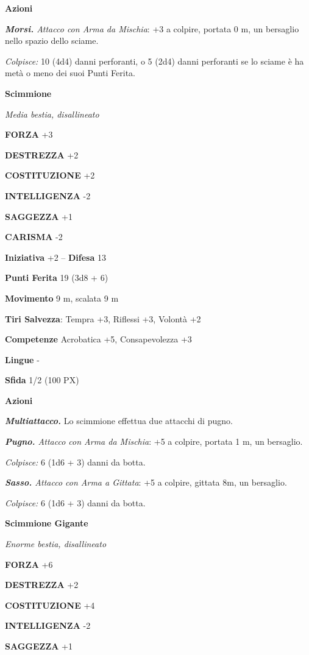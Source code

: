 \begin{multicols}{2}
	\textbf{Azioni}

	\textit{\textbf{Morsi.} Attacco con Arma da Mischia}: +3 a colpire, portata 0 m, un bersaglio nello spazio dello sciame.

	\textit{Colpisce:} 10 (4d4) danni perforanti, o 5 (2d4) danni perforanti se lo sciame è ha metà o meno dei suoi Punti Ferita.

	\medskip\textbf{Scimmione}

	\textit{Media bestia, disallineato}

	\textbf{FORZA} +3

	\textbf{DESTREZZA} +2

	\textbf{COSTITUZIONE} +2

	\textbf{INTELLIGENZA} -2

	\textbf{SAGGEZZA} +1

	\textbf{CARISMA} -2

	\textbf{Iniziativa} +2 -- \textbf{Difesa} 13

	\textbf{Punti Ferita} 19 (3d8 + 6)

	\textbf{Movimento} 9 m, scalata 9 m

	\textbf{Tiri Salvezza}: Tempra +3, Riflessi +3, Volontà +2

	\textbf{Competenze} Acrobatica +5, Consapevolezza +3

	\textbf{Lingue} -

	\textbf{Sfida} 1/2 (100 PX)

	\textbf{Azioni}

	\textit{\textbf{Multiattacco.}} Lo scimmione effettua due attacchi di pugno.

	\textit{\textbf{Pugno.} Attacco con Arma da Mischia}: +5 a colpire, portata 1 m, un bersaglio.

	\textit{Colpisce:} 6 (1d6 + 3) danni da botta.

	\textit{\textbf{Sasso.} Attacco con Arma a Gittata}: +5 a colpire, gittata 8m, un bersaglio.

	\textit{Colpisce:} 6 (1d6 + 3) danni da botta.

	\medskip\textbf{Scimmione Gigante}

	\textit{Enorme bestia, disallineato}

	\textbf{FORZA} +6

	\textbf{DESTREZZA} +2

	\textbf{COSTITUZIONE} +4

	\textbf{INTELLIGENZA} -2

	\textbf{SAGGEZZA} +1


\end{multicols}
